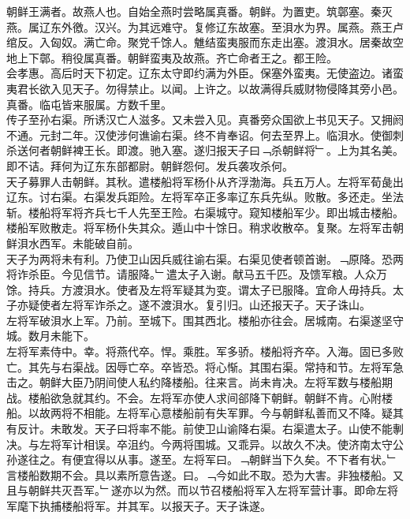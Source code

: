 \documentclass{zhvt-classic}
\begin{document}

\hspace*{2em}朝鲜王满者。故燕人也。自始全燕时尝略属真番。朝鲜。为置吏。筑鄣塞。秦灭燕。属辽东外徼。汉兴。为其远难守。复修辽东故塞。至浿水为界。属燕。燕王卢绾反。入匈奴。满亡命。聚党千馀人。魋结蛮夷服而东走出塞。渡浿水。居秦故空地上下鄣。稍役属真番。朝鲜蛮夷及故燕。齐亡命者王之。都王险。\\
\hspace*{2em}会孝惠。高后时天下初定。辽东太守即约满为外臣。保塞外蛮夷。无使盗边。诸蛮夷君长欲入见天子。勿得禁止。以闻。上许之。以故满得兵威财物侵降其旁小邑。真番。临屯皆来服属。方数千里。\\
\hspace*{2em}传子至孙右渠。所诱汉亡人滋多。又未尝入见。真番旁众国欲上书见天子。又拥阏不通。元封二年。汉使涉何谯谕右渠。终不肯奉诏。何去至界上。临浿水。使御刺杀送何者朝鲜裨王长。即渡。驰入塞。遂归报天子曰﹁杀朝鲜将﹂。上为其名美。即不诘。拜何为辽东东部都尉。朝鲜怨何。发兵袭攻杀何。\\
\hspace*{2em}天子募罪人击朝鲜。其秋。遣楼船将军杨仆从齐浮渤海。兵五万人。左将军荀彘出辽东。讨右渠。右渠发兵距险。左将军卒正多率辽东兵先纵。败散。多还走。坐法斩。楼船将军将齐兵七千人先至王险。右渠城守。窥知楼船军少。即出城击楼船。楼船军败散走。将军杨仆失其众。遁山中十馀日。稍求收散卒。复聚。左将军击朝鲜浿水西军。未能破自前。\\
\hspace*{2em}天子为两将未有利。乃使卫山因兵威往谕右渠。右渠见使者顿首谢。﹁原降。恐两将诈杀臣。今见信节。请服降。﹂遣太子入谢。献马五千匹。及馈军粮。人众万馀。持兵。方渡浿水。使者及左将军疑其为变。谓太子已服降。宜命人毋持兵。太子亦疑使者左将军诈杀之。遂不渡浿水。复引归。山还报天子。天子诛山。\\
\hspace*{2em}左将军破浿水上军。乃前。至城下。围其西北。楼船亦往会。居城南。右渠遂坚守城。数月未能下。\\
\hspace*{2em}左将军素侍中。幸。将燕代卒。悍。乘胜。军多骄。楼船将齐卒。入海。固已多败亡。其先与右渠战。因辱亡卒。卒皆恐。将心惭。其围右渠。常持和节。左将军急击之。朝鲜大臣乃阴间使人私约降楼船。往来言。尚未肯决。左将军数与楼船期战。楼船欲急就其约。不会。左将军亦使人求间郤降下朝鲜。朝鲜不肯。心附楼船。以故两将不相能。左将军心意楼船前有失军罪。今与朝鲜私善而又不降。疑其有反计。未敢发。天子曰将率不能。前使卫山谕降右渠。右渠遣太子。山使不能剸决。与左将军计相误。卒沮约。今两将围城。又乖异。以故久不决。使济南太守公孙遂往之。有便宜得以从事。遂至。左将军曰。﹁朝鲜当下久矣。不下者有状。﹂言楼船数期不会。具以素所意告遂。曰。﹁今如此不取。恐为大害。非独楼船。又且与朝鲜共灭吾军。﹂遂亦以为然。而以节召楼船将军入左将军营计事。即命左将军麾下执捕楼船将军。并其军。以报天子。天子诛遂。\\
\end{document}
